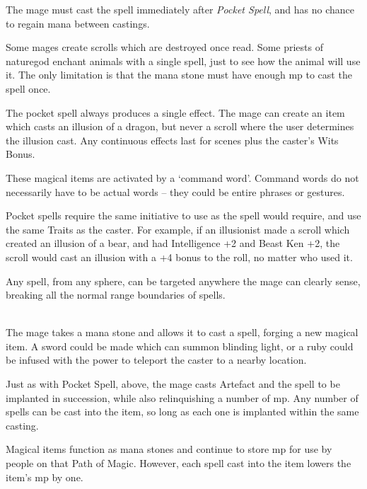 \begin{multicols}{2}
The mage must cast the spell immediately after \textit{Pocket Spell}, and has no chance to regain mana between castings.

Some mages create scrolls which are destroyed once read.  Some priests of \gls{naturegod} enchant animals with a single spell, just to see how the animal will use it.
The only limitation is that the mana stone must have enough \gls{mp} to cast the spell once.

The pocket spell always produces a single effect.
The mage can create an item which casts an illusion of a dragon, but never a scroll where the user determines the illusion cast.
Any continuous effects last for  scenes plus the caster's Wits Bonus.

These magical items are activated by a `command word'.
Command words do not necessarily have to be actual words -- they could be entire phrases or gestures.

Pocket spells require the same initiative to use as the spell would require, and use the same Traits as the caster.
For example, if an illusionist made a scroll which created an illusion of a bear, and had Intelligence +2 and Beast Ken +2, the scroll would cast an illusion with a +4 bonus to the roll, no matter who used it.

\spelllevel


Any spell, from any sphere, can be targeted anywhere the mage can clearly sense, breaking all the normal range boundaries of spells.

\spelllevel

\\
The mage takes a mana stone and allows it to cast a spell, forging a new magical item. A sword could be made which can summon blinding light, or a ruby could be infused with the power to teleport the caster to a nearby location.

Just as with Pocket Spell, above, the mage casts Artefact and the spell to be implanted in succession, while also relinquishing a number of \gls{mp}.
Any number of spells can be cast into the item, so long as each one is implanted within the same casting.

Magical items function as mana stones and continue to store \gls{mp} for use by people on that Path of Magic.
However, each spell cast into the item lowers the item's \gls{mp} by one.


\end{multicols}
